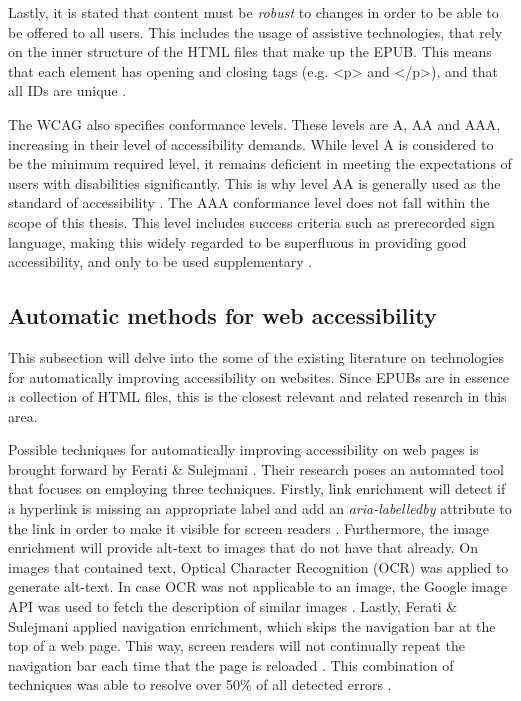 Lastly, it is stated that content must be \textit{robust} to changes in order to be able to be offered to all users. This includes the usage of assistive technologies, that rely on the inner structure of the HTML files that make up the EPUB. This means that each element has opening and closing tags (e.g. <p> and </p>), and that all IDs are unique \cite{Caldwell2008}.

The WCAG also specifies conformance levels. These levels are A, AA and AAA, increasing in their level of accessibility demands. While level A is considered to be the minimum required level, it remains deficient in meeting the expectations of users with disabilities significantly. This is why level AA is generally used as the standard of accessibility \cite{KBDaisyWCAG}. The AAA conformance level does not fall within the scope of this thesis. This level includes success criteria such as prerecorded sign language, making this widely regarded to be superfluous in providing good accessibility, and only to be used supplementary \cite{WCAGGuidelines, KBDaisyWCAG}.

\subsection{Automatic methods for web accessibility}
This subsection will delve into the some of the existing literature on technologies for automatically improving accessibility on websites. Since EPUBs are in essence a collection of HTML files, this is the closest relevant and related research in this area.

Possible techniques for automatically improving accessibility on web pages is brought forward by Ferati \& Sulejmani \cite{Ferati2016}. Their research poses an automated tool that focuses on employing three techniques. Firstly, link enrichment will detect if a hyperlink is missing an appropriate label and add an \textit{aria-labelledby} attribute to the link in order to make it visible for screen readers \cite{Ferati2016}. Furthermore, the image enrichment will provide alt-text to images that do not have that already. On images that contained text, Optical Character Recognition (OCR) was applied to generate alt-text. In case OCR was not applicable to an image, the Google image API was used to fetch the description of similar images \cite{Ferati2016}. Lastly, Ferati \& Sulejmani applied navigation enrichment, which skips the navigation bar at the top of a web page. This way, screen readers will not continually repeat the navigation bar each time that the page is reloaded \cite{Ferati2016}. This combination of techniques was able to resolve over 50\% of all detected errors \cite{Ferati2016}.

